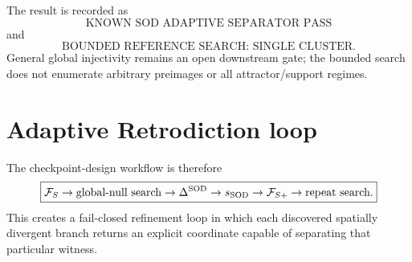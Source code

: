 The result is recorded as
\[
\boxed{\text{KNOWN SOD ADAPTIVE SEPARATOR PASS}}
\]
and
\[
\boxed{\text{BOUNDED REFERENCE SEARCH: SINGLE CLUSTER}}.
\]
General global injectivity remains an open downstream gate; the bounded search does not enumerate arbitrary preimages or all attractor/support regimes.

\section{Adaptive Retrodiction loop}

The checkpoint-design workflow is therefore
\[
\boxed{
\mathcal F_S
\rightarrow \text{global-null search}
\rightarrow \Delta^{\rm SOD}
\rightarrow s_{\rm SOD}
\rightarrow \mathcal F_{S+}
\rightarrow \text{repeat search}.
}
\]
This creates a fail-closed refinement loop in which each discovered spatially divergent branch returns an explicit coordinate capable of separating that particular witness.
